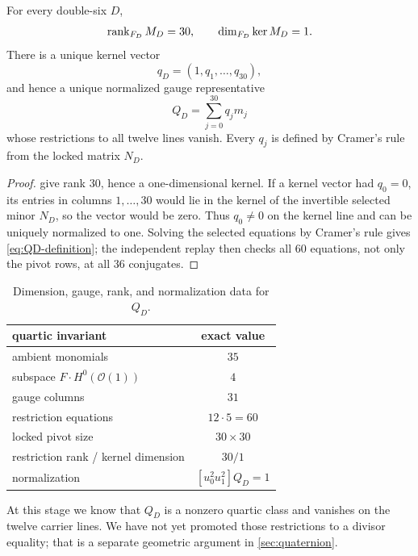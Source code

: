 \begin{theorem}
\label{thm:canonical-quartic}
For every double-six \(D\),
\[
 \operatorname{rank}_{F_D}M_D=30,\qquad \dim_{F_D}\ker M_D=1.
\]
There is a unique kernel vector
\[
 q_D=(1,q_1,\ldots,q_{30}),
\]
and hence a unique normalized gauge representative
\begin{equation}
 Q_D=\sum_{j=0}^{30}q_jm_j
\label{eq:QD-definition}
\end{equation}
whose restrictions to all twelve lines vanish.  Every \(q_j\) is defined by
Cramer's rule from the locked matrix \(N_D\).
\end{theorem}

\begin{proof}
 give rank \(30\), hence a
one-dimensional kernel.  If a kernel vector had \(q_0=0\), its entries in
columns \(1,\ldots,30\) would lie in the kernel of the invertible selected
minor \(N_D\), so the vector would be zero.  Thus \(q_0\ne0\) on the kernel
line and can be uniquely normalized to one.  Solving the selected equations
by Cramer's rule gives \cref{eq:QD-definition}; the independent replay then
checks all \(60\) equations, not only the pivot rows, at all \(36\)
conjugates.
\end{proof}

\begin{table}[t]
\centering
\begin{tabular}{@{}lc@{}}
\toprule
quartic invariant & exact value\\
\midrule
ambient monomials & \(35\)\\
subspace \(F\cdot H^0(\mathcal O(1))\) & \(4\)\\
gauge columns & \(31\)\\
restriction equations & \(12\cdot5=60\)\\
locked pivot size & \(30\times30\)\\
restriction rank / kernel dimension & \(30/1\)\\
normalization & \([u_0^2u_1^2]Q_D=1\)\\
\bottomrule
\end{tabular}
\caption{Dimension, gauge, rank, and normalization data for \(Q_D\).}
\label{tab:quartic-invariants}
\end{table}

At this stage we know that \(Q_D\) is a nonzero quartic class and vanishes on
the twelve carrier lines.  We have not yet promoted those restrictions to a
divisor equality; that is a separate geometric argument in
\cref{sec:quaternion}.

